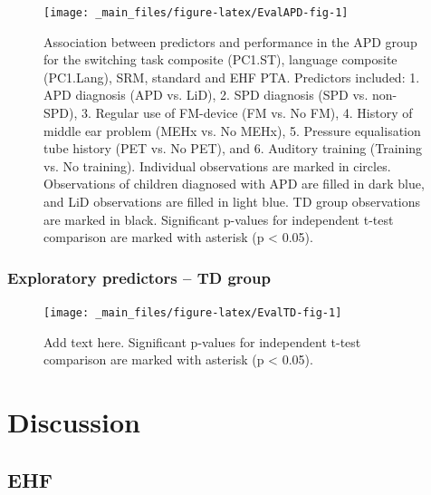 \documentclass[a4paper, twoside]{templates/ociamthesis}
\begin{document}
\begin{figure}

{\centering \texttt{[image: \_main\_files/figure-latex/EvalAPD-fig-1]} 

}

\caption{Association between predictors and performance in the APD group for the switching task composite (PC1.ST), language composite (PC1.Lang), SRM, standard and EHF PTA. Predictors included: 1. APD diagnosis (APD vs. LiD), 2. SPD diagnosis (SPD vs. non-SPD), 3. Regular use of FM-device (FM vs. No FM), 4. History of middle ear problem (MEHx vs. No MEHx), 5. Pressure equalisation tube history (PET vs. No PET), and 6. Auditory training (Training vs. No training). Individual observations are marked in circles. Observations of children diagnosed with APD are filled in dark blue, and LiD observations are filled in light blue. TD group observations are marked in black. Significant p-values for independent t-test comparison are marked with asterisk (p < 0.05).}\label{fig:EvalAPD-fig}
\end{figure}

\hypertarget{exploratory-predictors-td-group}{%
\subsubsection{Exploratory predictors -- TD group}\label{exploratory-predictors-td-group}}

\begin{figure}

{\centering \texttt{[image: \_main\_files/figure-latex/EvalTD-fig-1]} 

}

\caption{Add text here. Significant p-values for independent t-test comparison are marked with asterisk (p < 0.05).}\label{fig:EvalTD-fig}
\end{figure}

\hfill\break

\newpage

\hypertarget{discussion-4}{%
\section{Discussion}\label{discussion-4}}

\newpage

\hypertarget{ehf}{%
\subsection{EHF}\label{ehf}}
\end{document}
